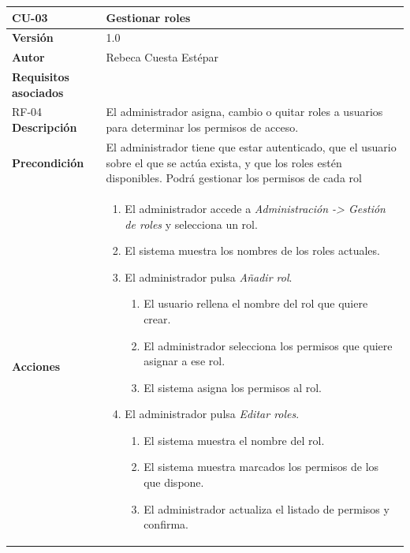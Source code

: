 \begin{table}[p]
	\centering
	\begin{tabularx}{\linewidth}{ p{} p{} }
		\toprule
		\textbf{CU-03}    & \textbf{Gestionar roles}\\
		\toprule
		\textbf{Versión}              & 1.0    \\
		\textbf{Autor}                & Rebeca Cuesta Estépar \\
		\textbf{Requisitos asociados} &  \\ RF-04
		\textbf{Descripción}          & El administrador asigna, cambio o quitar roles a usuarios para determinar los permisos de acceso. \\
		\textbf{Precondición}         & El administrador tiene que estar autenticado, que el usuario sobre el que se actúa exista, y que los roles estén disponibles. Podrá gestionar los permisos de cada rol \\
		\textbf{Acciones}             &
		\begin{enumerate}
			\def\labelenumi{\arabic{enumi}.}
			\tightlist
			\item El administrador accede a \emph{Administración -> Gestión de roles} y selecciona un rol.
			\item El sistema muestra los nombres de los roles actuales.
			\item El administrador pulsa \emph{Añadir rol}.
			\begin{enumerate}[label*=\arabic*., itemsep=0.5pt, topsep=0.5pt, leftmargin=1em]
				\item El usuario rellena el nombre del rol que quiere crear.
				\item El administrador selecciona los permisos que quiere asignar a ese rol.
				\item El sistema asigna los permisos al rol.
			\end{enumerate}
			\item El administrador pulsa \emph{Editar roles}.
			\begin{enumerate}[label*=\arabic*., itemsep=0.5pt, topsep=0.5pt, leftmargin=1em]
			\item El sistema muestra el nombre del rol.
			\item El sistema muestra marcados los permisos de los que dispone.
			\item El administrador actualiza el listado de permisos y confirma.
			\end{enumerate}
			\begin{enumerate}[label*=\arabic*., itemsep=0.5pt, topsep=0.5pt, leftmargin=1em]

\end{enumerate}
\end{enumerate}
\end{tabularx}
\end{table}
